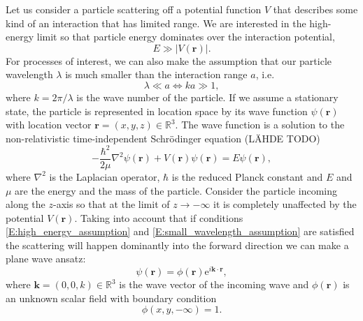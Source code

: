 \documentclass[a4paper, twoside, english, 12pt]{article}
\begin{document}
Let us consider a particle scattering off a potential function $V$ that describes some kind of an interaction that has limited range. We are interested in the high-energy limit so that particle energy dominates over the interaction potential,
\begin{equation}\label{E:high_energy_assumption}
	E\gg|V(\mathbf{r})|.
\end{equation} 
For processes of interest, we can also make the assumption that our particle wavelength $\lambda$ is much smaller than the interaction range $a$, i.e.
\begin{equation}\label{E:small_wavelength_assumption}
	\lambda \ll a \iff ka\gg 1,
\end{equation}
where $k=2\pi/\lambda$ is the wave number of the particle. If we assume a stationary state, the particle is represented in location space by its wave function $\psi(\mathbf{r})$ with location vector $\mathbf{r}=(x,y,z) \in \mathbb{R}^3$. The wave function is a solution to the non-relativistic time-independent Schrödinger equation (LÄHDE TODO)
\begin{equation}\label{E:schrode}
	-\frac{\hbar^2}{2\mu}\nabla^2\psi(\mathbf{r}) + V(\mathbf{r})\psi(\mathbf{r}) = E\psi(\mathbf{r}),
\end{equation}
where $\nabla^2$ is the Laplacian operator, $\hbar$ is the reduced Planck constant and $E$ and $\mu$ are the energy and the mass of the particle. Consider the particle incoming along the $z$-axis so that at the limit of $z \to -\infty$ it is completely unaffected by the potential $V(\mathbf{r})$. Taking into account that if conditions \eqref{E:high_energy_assumption} and \eqref{E:small_wavelength_assumption} are satisfied the scattering will happen dominantly into the forward direction we can make a plane wave ansatz:
\begin{equation}\label{E:planewave}
	\psi(\mathbf{r}) = \phi(\mathbf{r})\mathrm{e}^{i \mathbf{k}\cdot\mathbf{r}},
\end{equation}
where $\mathbf{k}=(0,0,k)\in \mathbb{R}^3$ is the wave vector of the incoming wave and $\phi(\mathbf{r})$ is an unknown scalar field with boundary condition
\begin{equation}\label{E:BC_for_phi}
\phi(x,y,-\infty)=1.
\end{equation}
\end{document}
